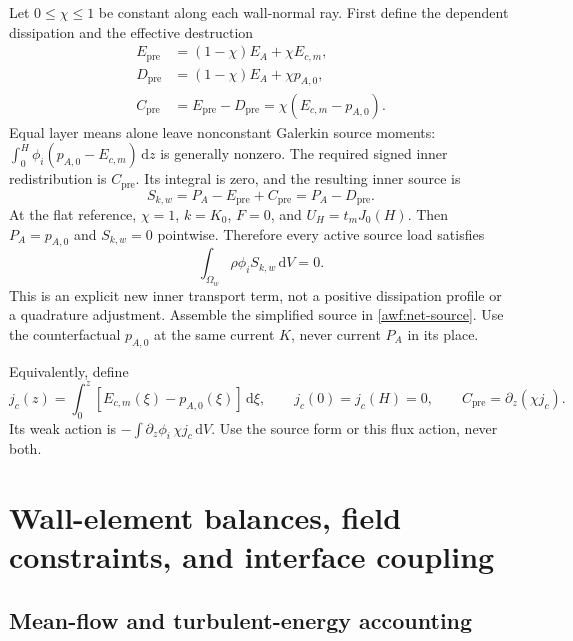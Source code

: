 \documentclass[11pt,a4paper]{article}
\numberwithin{equation}{section}
\newcommand{\dd}{\mathrm d}
\begin{document}
Let $0\leq\chi\leq1$ be constant along each wall-normal ray.
First define the dependent dissipation and the effective destruction
\begin{equation}
 \begin{aligned}
 E_{\mathrm{pre}}&=(1-\chi)E_A+\chi E_{c,m},\\
 D_{\mathrm{pre}}&=(1-\chi)E_A+\chi p_{A,0},\\
 C_{\mathrm{pre}}&=E_{\mathrm{pre}}-D_{\mathrm{pre}}
                 =\chi(E_{c,m}-p_{A,0}).
 \end{aligned}
 \label{awf:pre-profiles}
\end{equation}
Equal layer means alone leave nonconstant Galerkin source moments:
$\int_0^H\phi_i(p_{A,0}-E_{c,m})\,\dd z$ is generally nonzero.
The required signed inner redistribution is $C_{\mathrm{pre}}$.
Its integral is zero, and the resulting inner source is
\begin{equation}
 \boxed{
 S_{k,w}=P_A-E_{\mathrm{pre}}+C_{\mathrm{pre}}
 =P_A-D_{\mathrm{pre}}.
 }
 \label{awf:net-source}
\end{equation}
At the flat reference, $\chi=1$, $k=K_0$, $F=0$, and
$U_H=t_mJ_0(H)$. Then $P_A=p_{A,0}$ and $S_{k,w}=0$
pointwise. Therefore every active source load satisfies
\begin{equation}
 \boxed{\int_{\Omega_w}\rho\phi_iS_{k,w}\,\dd V=0.}
 \label{awf:all-moments}
\end{equation}
This is an explicit new inner transport term, not a positive
dissipation profile or a quadrature adjustment. Assemble the simplified
source in \cref{awf:net-source}. Use the counterfactual $p_{A,0}$
at the same current $K$, never current $P_A$ in its place.

Equivalently, define
\begin{equation}
 j_c(z)=\int_0^z[E_{c,m}(\xi)-p_{A,0}(\xi)]\,\dd\xi,\qquad
 j_c(0)=j_c(H)=0,\qquad C_{\mathrm{pre}}=\partial_z(\chi j_c).
 \label{awf:redistribution-flux}
\end{equation}
Its weak action is $-\int\partial_z\phi_i\,\chi j_c\,\dd V$.
Use the source form or this flux action, never both.

\section{Wall-element balances, field constraints, and interface coupling}
\label{awf:properties}

\subsection{Mean-flow and turbulent-energy accounting}
\end{document}
